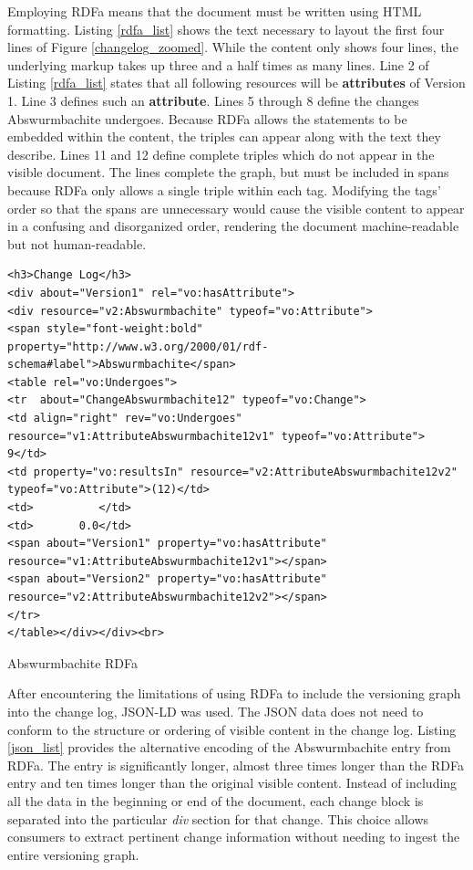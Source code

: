 Employing RDFa means that the document must be written using HTML formatting.
Listing \ref{rdfa_list} shows the text necessary to layout the first four lines of Figure \ref{changelog_zoomed}.
While the content only shows four lines, the underlying markup takes up three and a half times as many lines.
Line 2 of Listing \ref{rdfa_list} states that all following resources will be \textbf{attributes} of Version 1.
Line 3 defines such an \textbf{attribute}.
Lines 5 through 8 define the changes Abswurmbachite undergoes.
Because RDFa allows the statements to be embedded within the content, the triples can appear along with the text they describe.
Lines 11 and 12 define complete triples which do not appear in the visible document.
The lines complete the graph, but must be included in spans because RDFa only allows a single triple within each tag.
Modifying the tags' order so that the spans are unnecessary would cause the visible content to appear in a confusing and disorganized order, rendering the document machine-readable but not human-readable.

\begin{listing}
	\begin{verbatim}
<h3>Change Log</h3>
<div about="Version1" rel="vo:hasAttribute">
<div resource="v2:Abswurmbachite" typeof="vo:Attribute">
<span style="font-weight:bold" property="http://www.w3.org/2000/01/rdf-schema#label">Abswurmbachite</span>
<table rel="vo:Undergoes">
<tr  about="ChangeAbswurmbachite12" typeof="vo:Change">
<td align="right" rev="vo:Undergoes" resource="v1:AttributeAbswurmbachite12v1" typeof="vo:Attribute"> 9</td>
<td property="vo:resultsIn" resource="v2:AttributeAbswurmbachite12v2" typeof="vo:Attribute">(12)</td>
<td>          </td>
<td>       0.0</td>
<span about="Version1" property="vo:hasAttribute" resource="v1:AttributeAbswurmbachite12v1"></span>
<span about="Version2" property="vo:hasAttribute" resource="v2:AttributeAbswurmbachite12v2"></span>
</tr>
</table></div></div><br>
	\end{verbatim}
	\label{rdfa_list}
	\caption{Abswurmbachite RDFa}
\end{listing}

After encountering the limitations of using RDFa to include the versioning graph into the change log, JSON-LD was used.
The JSON data does not need to conform to the structure or ordering of visible content in the change log.
Listing \ref{json_list} provides the alternative encoding of the Abswurmbachite entry from RDFa.
The entry is significantly longer, almost three times longer than the RDFa entry and ten times longer than the original visible content.
Instead of including all the data in the beginning or end of the document, each change block is separated into the particular \textit{div} section for that change.
This choice allows consumers to extract pertinent change information without needing to ingest the entire versioning graph.

